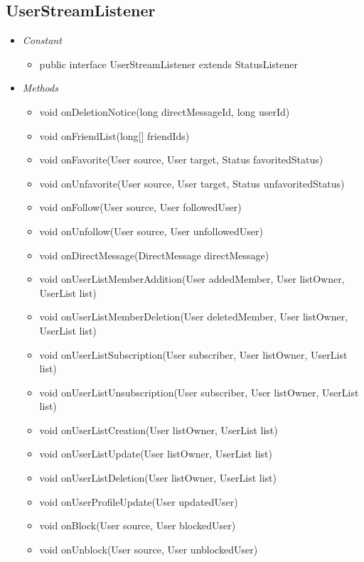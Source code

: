 	\subsection{UserStreamListener}
	\begin{itemize}
		\item \textit{Constant}
		
		\begin{itemize}
			\item public interface UserStreamListener
			extends StatusListener
		\end{itemize}
		\item \textit{Methods}
		
		\begin{itemize}
			\item void onDeletionNotice(long directMessageId, long userId)
			\item void onFriendList(long[] friendIds)
			\item void onFavorite(User source, User target, Status favoritedStatus)
			\item void onUnfavorite(User source, User target, Status unfavoritedStatus)
			\item void onFollow(User source, User followedUser)
			\item void onUnfollow(User source, User unfollowedUser)
			\item void onDirectMessage(DirectMessage directMessage)
			\item void onUserListMemberAddition(User addedMember, User listOwner, UserList list)
			\item void onUserListMemberDeletion(User deletedMember, User listOwner, UserList list)
			\item void onUserListSubscription(User subscriber, User listOwner, UserList list)
			\item void onUserListUnsubscription(User subscriber, User listOwner, UserList list)
			\item void onUserListCreation(User listOwner, UserList list)
			\item void onUserListUpdate(User listOwner, UserList list)
			\item void onUserListDeletion(User listOwner, UserList list)
			\item void onUserProfileUpdate(User updatedUser)
			\item void onBlock(User source, User blockedUser)
			\item void onUnblock(User source, User unblockedUser)
		\end{itemize}
	\end{itemize}
	
